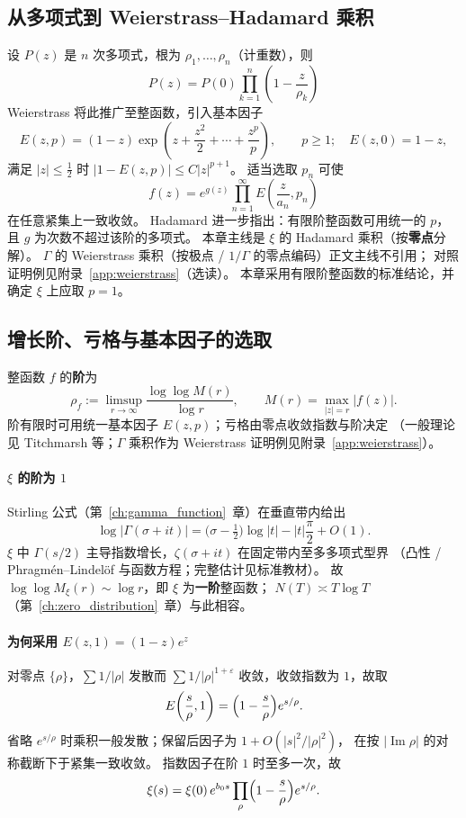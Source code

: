 \subsection{从多项式到 Weierstrass--Hadamard 乘积}

设 $P(z)$ 是 $n$ 次多项式，根为 $\rho_1,\ldots,\rho_n$（计重数），则
\[
P(z) = P(0)\prod_{k=1}^n\left(1-\frac{z}{\rho_k}\right) \tag{1}
\]
Weierstrass 将此推广至整函数，引入基本因子
\[
E(z, p) = (1-z)\exp\!\left(z + \frac{z^2}{2} + \cdots + \frac{z^p}{p}\right), \qquad p \geq 1; \quad E(z,0) = 1-z,
\tag{2}
\]
满足 $|z|\le\frac12$ 时 $|1-E(z,p)|\le C|z|^{p+1}$。
适当选取 $p_n$ 可使
\begin{equation}
f(z) = e^{g(z)} \prod_{n=1}^\infty E\left(\frac{z}{a_n}, p_n\right)
\label{eq:weierstrass-general}
\tag{3}
\end{equation}
在任意紧集上一致收敛。
Hadamard 进一步指出：有限阶整函数可用统一的 $p$，且 $g$ 为次数不超过该阶的多项式。
本章主线是 $\xi$ 的 Hadamard 乘积（按\textbf{零点}分解）。
$\Gamma$ 的 Weierstrass 乘积（按极点 / $1/\Gamma$ 的零点编码）正文主线不引用；
对照证明例见附录~\ref{app:weierstrass}（选读）。
本章采用有限阶整函数的标准结论，并确定 $\xi$ 上应取 $p=1$。

\subsection{增长阶、亏格与基本因子的选取}
\label{sec:xi-order-genus}

整函数 $f$ 的\textbf{阶}为
\[
  \rho_f
  :=\limsup_{r\to\infty}
  \frac{\log\log M(r)}{\log r},
  \qquad
  M(r)=\max_{|z|=r}|f(z)|.
\]
阶有限时可用统一基本因子 $E(z,p)$；亏格由零点收敛指数与阶决定
（一般理论见 Titchmarsh 等；$\Gamma$ 乘积作为 Weierstrass 证明例见附录~\ref{app:weierstrass}）。

\paragraph{$\xi$ 的阶为 $1$}
Stirling 公式（第~\ref{ch:gamma_function}~章）在垂直带内给出
\[
  \log\bigl|\Gamma(\sigma+it)\bigr|
  =\bigl(\sigma-\tfrac12\bigr)\log|t|-|t|\frac{\pi}{2}+O(1).
\]
$\xi$ 中 $\Gamma(s/2)$ 主导指数增长，$\zeta(\sigma+it)$ 在固定带内至多多项式型界
（凸性 / Phragm\'en--Lindel\"of 与函数方程；完整估计见标准教材）。
故 $\log\log M_\xi(r)\sim\log r$，即 $\xi$ 为\textbf{一阶}整函数；
$N(T)\asymp T\log T$（第~\ref{ch:zero_distribution}~章）与此相容。

\paragraph{为何采用 $E(z,1)=(1-z)e^{z}$}
对零点 $\{\rho\}$，$\sum 1/|\rho|$ 发散而 $\sum 1/|\rho|^{1+\varepsilon}$ 收敛，收敛指数为 $1$，故取
\[
  E\!\left(\frac{s}{\rho},1\right)
  =\Bigl(1-\frac{s}{\rho}\Bigr)e^{s/\rho}.
\]
省略 $e^{s/\rho}$ 时乘积一般发散；保留后因子为 $1+O(|s|^2/|\rho|^2)$，
在按 $|\operatorname{Im}\rho|$ 的对称截断下于紧集一致收敛。
指数因子在阶 $1$ 时至多一次，故
\[
  \xi(s)=\xi(0)\,e^{b_0 s}
  \prod_{\rho}
  \Bigl(1-\frac{s}{\rho}\Bigr)e^{s/\rho}.
\]

